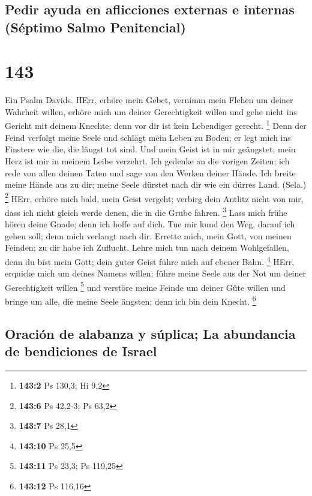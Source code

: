 \hypertarget{pedir-ayuda-en-aflicciones-externas-e-internas-suxe9ptimo-salmo-penitencial}{%
\subsection{Pedir ayuda en aflicciones externas e internas (Séptimo
Salmo
Penitencial)}\label{pedir-ayuda-en-aflicciones-externas-e-internas-suxe9ptimo-salmo-penitencial}}

\hypertarget{section-142}{%
\section{143}\label{section-142}}

 Ein Psalm Davids. HErr, erhöre mein Gebet, vernimm mein
Flehen um deiner Wahrheit willen, erhöre mich um deiner Gerechtigkeit
willen  und gehe nicht ins Gericht mit deinem Knechte;
denn vor dir ist kein Lebendiger gerecht. \footnote{\textbf{143:2} Ps
  130,3; Hi 9,2}  Denn der Feind verfolgt meine Seele und
schlägt mein Leben zu Boden; er legt mich ins Finstere wie die, die
längst tot sind.  Und mein Geist ist in mir geängstet;
mein Herz ist mir in meinem Leibe verzehrt.  Ich gedenke
an die vorigen Zeiten; ich rede von allen deinen Taten und sage von den
Werken deiner Hände.  Ich breite meine Hände aus zu dir;
meine Seele dürstet nach dir wie ein dürres Land. (Sela.) \footnote{\textbf{143:6}
  Ps 42,2-3; Ps 63,2}  HErr, erhöre mich bald, mein Geist
vergeht; verbirg dein Antlitz nicht von mir, dass ich nicht gleich werde
denen, die in die Grube fahren. \footnote{\textbf{143:7} Ps 28,1}
 Lass mich frühe hören deine Gnade; denn ich hoffe auf
dich. Tue mir kund den Weg, darauf ich gehen soll; denn mich verlangt
nach dir.  Errette mich, mein Gott, von meinen Feinden; zu
dir habe ich Zuflucht.  Lehre mich tun nach deinem
Wohlgefallen, denn du bist mein Gott; dein guter Geist führe mich auf
ebener Bahn. \footnote{\textbf{143:10} Ps 25,5}  HErr,
erquicke mich um deines Namens willen; führe meine Seele aus der Not um
deiner Gerechtigkeit willen \footnote{\textbf{143:11} Ps 23,3; Ps 119,25}
 und verstöre meine Feinde um deiner Güte willen und
bringe um alle, die meine Seele ängsten; denn ich bin dein Knecht.
\footnote{\textbf{143:12} Ps 116,16}

\hypertarget{oraciuxf3n-de-alabanza-y-suxfaplica-la-abundancia-de-bendiciones-de-israel}{%
\subsection{Oración de alabanza y súplica; La abundancia de bendiciones
de
Israel}\label{oraciuxf3n-de-alabanza-y-suxfaplica-la-abundancia-de-bendiciones-de-israel}}

